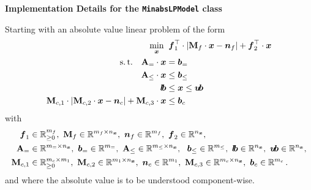 \documentclass{article}
\newcommand{\tp}{\top}%
\newcommand{\setR}{\mathbb{R}}%
\newcommand{\vectorfont}[1]{\boldsymbol{#1}}%
\newcommand{\matrixfont}[1]{\mathbf{#1}}%
\newcommand{\bvec}{\vectorfont{b}}
\newcommand{\fvec}{\vectorfont{f}}
\newcommand{\nvec}{\vectorfont{n}}
\newcommand{\xvec}{\vectorfont{x}}
\newcommand{\lbvec}{\vectorfont{l\negthinspace b}}
\newcommand{\ubvec}{\vectorfont{u\negthinspace b}}
\newcommand{\Amat}{\matrixfont{A}}
\newcommand{\Mmat}{\matrixfont{M}}
\begin{document}
\begin{center}
	{\Large\textbf{Implementation Details for the \texttt{MinabsLPModel} class}}
\end{center}

Starting with an absolute value linear problem of the form
\begin{subequations}
\begin{align}
\min_{\xvec} \;& \;\fvec_1^{\tp} \cdot \lvert \Mmat_f \cdot \xvec - \nvec_f \rvert + \fvec_2^{\tp} \cdot \xvec
\label{eq:minabs:obj}
\\
\text{s.\,t.} \quad
\Amat_{=}\cdot \xvec &= \bvec_{=}
\label{eq:minabs:eq1}
\\
\Amat_{\leq} \cdot \xvec &\leq \bvec_{\leq}
\label{eq:minabs:ineq1}
\\
\lbvec &\leq \xvec \leq \ubvec
\label{eq:minabs:bounds}
\\
\Mmat_{c,1} \cdot \lvert \Mmat_{c,2} \cdot \xvec -\nvec_c \rvert + \Mmat_{c,3}\cdot \xvec &\leq \bvec_c
\label{eq:minabs:absineq}
\end{align}
\end{subequations}
with
\[
\begin{split}
\fvec_1 &\in \setR^{m_f}_{\geq 0},~
\Mmat_f \in \setR^{m_f \times n_{\xvec}},~
\nvec_f \in \setR^{m_f},~
\fvec_2 \in \setR^{n_{\xvec}},
\\
\Amat_{=} &\in \setR^{m_= \times n_{\xvec}},~
\bvec_{=} \in \setR^{m_=},~
\Amat_{\leq} \in \setR^{m_{\leq}\times n_{\xvec}},~~
\bvec_{\leq} \in \setR^{m_\leq},~
\lbvec \in \setR^{n_{\xvec}},~
\ubvec \in \setR^{n_{\xvec}},
\\
\Mmat_{c,1} &\in \setR^{m_c \times m_1}_{\geq 0},~
\Mmat_{c,2} \in \setR^{m_1 \times n_{\xvec}},~
\nvec_c \in \setR^{m_1},~
\Mmat_{c,3} \in \setR^{m_c \times n_{\xvec}},~
\bvec_c \in \setR^{m_c}\,.
\end{split}
\]
and where the absolute value is to be understood component-wise.
\end{document}
